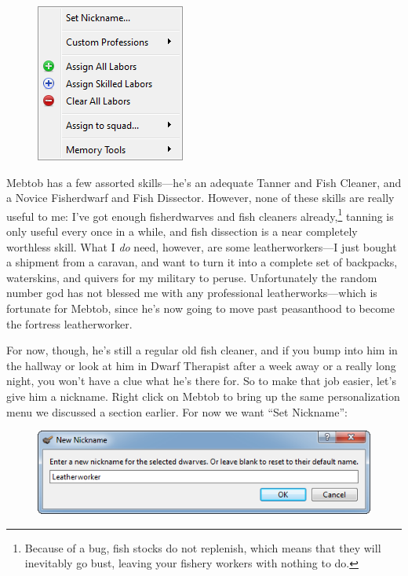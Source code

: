 \documentclass[]{article}
\begin{document}
\begin{figure}
  \begin{center}
    \includegraphics{Sec2Fig14}
  \end{center}
\end{figure}
Mebtob has a few assorted skills---he's an adequate Tanner and Fish Cleaner, and a Novice Fisherdwarf and
Fish Dissector. However, none of these skills are really useful to me: I've got enough fisherdwarves and
fish cleaners already,\footnote{Because of a bug, fish stocks do not replenish, which means that they
will inevitably go bust, leaving your fishery workers with nothing to do.} tanning is only useful every
once in a while, and fish dissection is a near completely worthless skill. What I \emph{do} need,
however, are some leatherworkers---I just bought a shipment from a caravan, and want to turn it into a
complete set of backpacks, waterskins, and quivers for my military to peruse. Unfortunately the random
number god has not blessed me with any professional leatherworks---which is fortunate for Mebtob, since
he's now going to move past peasanthood to become the fortress leatherworker.

For now, though, he's still a regular old fish cleaner, and if you bump into him in the hallway or look
at him in Dwarf Therapist after a week away or a really long night, you won't have a clue what he's there
for. So to make that job easier, let's give him a nickname. Right click on Mebtob to bring up the same
personalization menu we discussed a section earlier. For now we want ``Set Nickname'':
\newpage

\begin{figure}[h!] \centering
\includegraphics{Sec2Fig15}
\end{figure}
\end{document}
